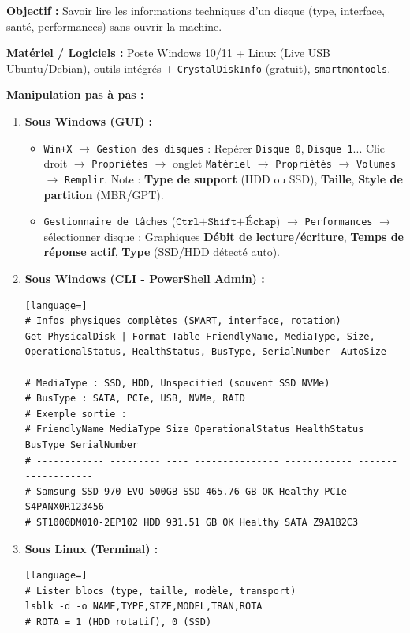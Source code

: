 \documentclass[11pt]{article}
\begin{document}
\begin{experience}
\textbf{Objectif :} Savoir lire les informations techniques d'un disque (type, interface, santé, performances) sans ouvrir la machine.

\textbf{Matériel / Logiciels :} Poste Windows 10/11 + Linux (Live USB Ubuntu/Debian), outils intégrés + \texttt{CrystalDiskInfo} (gratuit), \texttt{smartmontools}.

\textbf{Manipulation pas à pas :}
\begin{enumerate}
    \item \textbf{Sous Windows (GUI) :}
    \begin{itemize}
        \item \texttt{Win+X} $\to$ \texttt{Gestion des disques} : Repérer \texttt{Disque 0}, \texttt{Disque 1}... Clic droit $\to$ \texttt{Propriétés} $\to$ onglet \texttt{Matériel} $\to$ \texttt{Propriétés} $\to$ \texttt{Volumes} $\to$ \texttt{Remplir}. Note : \textbf{Type de support} (HDD ou SSD), \textbf{Taille}, \textbf{Style de partition} (MBR/GPT).
        \item \texttt{Gestionnaire de tâches} ($\texttt{Ctrl+Shift+Échap}$) $\to$ \texttt{Performances} $\to$ sélectionner disque : Graphiques \textbf{Débit de lecture/écriture}, \textbf{Temps de réponse actif}, \textbf{Type} (SSD/HDD détecté auto).
    \end{itemize}
    \item \textbf{Sous Windows (CLI - PowerShell Admin) :}
\begin{lstlisting}[language=]
# Infos physiques complètes (SMART, interface, rotation)
Get-PhysicalDisk | Format-Table FriendlyName, MediaType, Size, OperationalStatus, HealthStatus, BusType, SerialNumber -AutoSize

# MediaType : SSD, HDD, Unspecified (souvent SSD NVMe)
# BusType : SATA, PCIe, USB, NVMe, RAID
# Exemple sortie :
# FriendlyName MediaType Size OperationalStatus HealthStatus BusType SerialNumber
# ------------ --------- ---- --------------- ------------ ------- ------------
# Samsung SSD 970 EVO 500GB SSD 465.76 GB OK Healthy PCIe S4PANX0R123456
# ST1000DM010-2EP102 HDD 931.51 GB OK Healthy SATA Z9A1B2C3
\end{lstlisting}
    \item \textbf{Sous Linux (Terminal) :}
\begin{lstlisting}[language=]
# Lister blocs (type, taille, modèle, transport)
lsblk -d -o NAME,TYPE,SIZE,MODEL,TRAN,ROTA
# ROTA = 1 (HDD rotatif), 0 (SSD)


\end{lstlisting}
\end{enumerate}
\end{experience}
\end{document}
